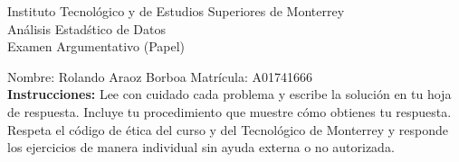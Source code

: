 \documentclass[10pt]{report}
\begin{document}
\newpage



\begin{center}
{\large Instituto Tecnol\'{o}gico y de Estudios Superiores de Monterrey \\
An\'alisis Estad\'stico de Datos } \\
Examen Argumentativo (Papel)
\end{center}

Nombre: \underline{\hspace*{.2in}}
Rolando Araoz Borboa
\underline{\hspace*{.2in}} \quad Matr\'icula:\underline{\hspace*{.2in}}
A01741666
\underline{\hspace*{.2in}} \\

{\bf Instrucciones:} Lee con cuidado cada problema y escribe la soluci\'on
en tu hoja de respuesta. Incluye tu procedimiento que muestre c\'omo obtienes tu respuesta.  Respeta el c\'odigo de \'etica del curso y del Tecnol\'ogico de Monterrey y responde los ejercicios de manera individual sin ayuda externa o no autorizada.
\end{document}
